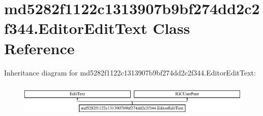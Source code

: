 \hypertarget{classmd5282f1122c1313907b9bf274dd2c2f344_1_1EditorEditText}{}\section{md5282f1122c1313907b9bf274dd2c2f344.\+Editor\+Edit\+Text Class Reference}
\label{classmd5282f1122c1313907b9bf274dd2c2f344_1_1EditorEditText}
Inheritance diagram for md5282f1122c1313907b9bf274dd2c2f344.\+Editor\+Edit\+Text\+:\begin{figure}[H]
\begin{center}
\leavevmode
\includegraphics[height=1.651917cm]{classmd5282f1122c1313907b9bf274dd2c2f344_1_1EditorEditText}
\end{center}
\end{figure}
